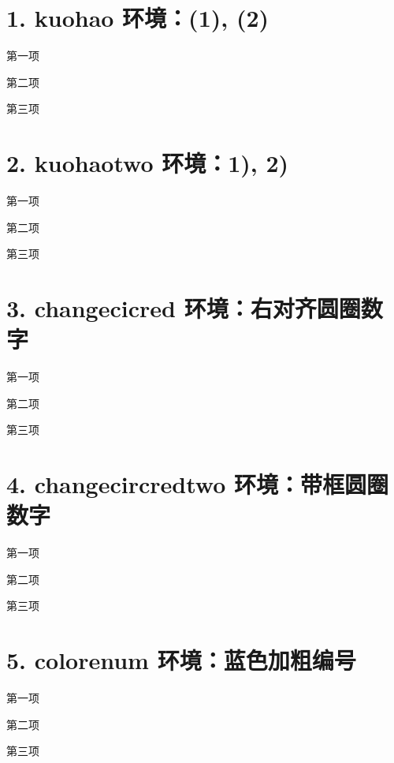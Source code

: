 

	\section*{1. kuohao 环境：(1), (2)}
	\begin{kuohao}
		\item 第一项
		\item 第二项
		\item 第三项
	\end{kuohao}
	
	\section*{2. kuohaotwo 环境：1), 2)}
	\begin{kuohaotwo}
		\item 第一项
		\item 第二项
		\item 第三项
	\end{kuohaotwo}
	
	\section*{3. changecicred 环境：右对齐圆圈数字}
	\begin{changecicred}
		\item 第一项
		\item 第二项
		\item 第三项
	\end{changecicred}
	
	\section*{4. changecircredtwo 环境：带框圆圈数字}
	\begin{changecircredtwo}
		\item 第一项
		\item 第二项
		\item 第三项
	\end{changecircredtwo}
	
	\section*{5. colorenum 环境：蓝色加粗编号}
	\begin{colorenum}
		\item 第一项
		\item 第二项
		\item 第三项
	\end{colorenum}
	
